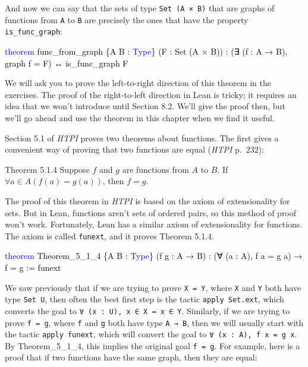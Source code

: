 \documentclass[
  letterpaper,
  DIV=11,
  numbers=noendperiod]{scrreprt}
\newenvironment{Shaded}{\begin{snugshade}}{\end{snugshade}}
\newcommand{\KeywordTok}[1]{\textcolor[rgb]{0.00,0.23,0.31}{#1}}
\newcommand{\NormalTok}[1]{\textcolor[rgb]{0.00,0.23,0.31}{#1}}
\renewcommand{\NormalTok}[1]{\textcolor[HTML]{000000}{#1}}
\renewcommand{\KeywordTok}[1]{\textcolor[HTML]{0000FF}{#1}}
\theoremstyle{remark}
\begin{document}
And now we can say that the sets of type \texttt{Set\ (A\ ×\ B)} that
are graphs of functions from \texttt{A} to \texttt{B} are precisely the
ones that have the property \texttt{is\_func\_graph}:

\begin{Shaded}
\begin{Highlighting}[]
\KeywordTok{theorem}\NormalTok{ func\_from\_graph \{A B : }\KeywordTok{Type}\NormalTok{\} (F : Set (A × B)) :}
\NormalTok{    (∃ (f : A → B), graph f = F) ↔ is\_func\_graph F}
\end{Highlighting}
\end{Shaded}

We will ask you to prove the left-to-right direction of this theorem in
the exercises. The proof of the right-to-left direction in Lean is
tricky; it requires an idea that we won't introduce until Section 8.2.
We'll give the proof then, but we'll go ahead and use the theorem in
this chapter when we find it useful.

Section 5.1 of \emph{HTPI} proves two theorems about functions. The
first gives a convenient way of proving that two functions are equal
(\emph{HTPI} p.~232):

\begin{nthm}{Theorem 5.1.4}
Suppose \(f\) and \(g\) are functions from \(A\) to \(B\). If
\(\forall a \in A(f(a) = g(a))\), then \(f = g\).

\end{nthm}

The proof of this theorem in \emph{HTPI} is based on the axiom of
extensionality for sets. But in Lean, functions aren't sets of ordered
pairs, so this method of proof won't work. Fortunately, Lean has a
similar axiom of extensionality for functions. The axiom is called
\texttt{funext}, and it proves Theorem 5.1.4.

\begin{Shaded}
\begin{Highlighting}[]
\KeywordTok{theorem}\NormalTok{ Theorem\_5\_1\_4 \{A B : }\KeywordTok{Type}\NormalTok{\} (f g : A → B) :}
\NormalTok{    (∀ (a : A), f a = g a) → f = g := funext}
\end{Highlighting}
\end{Shaded}

We saw previously that if we are trying to prove \texttt{X\ =\ Y}, where
\texttt{X} and \texttt{Y} both have type \texttt{Set\ U}, then often the
best first step is the tactic \texttt{apply\ Set.ext}, which converts
the goal to \texttt{∀\ (x\ :\ U),\ x\ ∈\ X\ ↔\ x\ ∈\ Y}. Similarly, if
we are trying to prove \texttt{f\ =\ g}, where \texttt{f} and \texttt{g}
both have type \texttt{A\ →\ B}, then we will usually start with the
tactic \texttt{apply\ funext}, which will convert the goal to
\texttt{∀\ (x\ :\ A),\ f\ x\ =\ g\ x}. By Theorem\_5\_1\_4, this implies
the original goal \texttt{f\ =\ g}. For example, here is a proof that if
two functions have the same graph, then they are equal:
\end{document}

